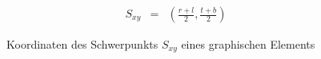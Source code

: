 \begin{figure}[H]
\begin{minipage}[c]{0.47\textwidth}
	\begin{flushright}
		
	\end{flushright}
\end{minipage}
\begin{minipage}[c]{0.47\textwidth}
\begin{flushleft}
		\begin{eqnarray*}
			S_{xy}	&=& \left(\frac{r+l}{2}, \frac{t+b}{2}\right)
		\end{eqnarray*}
\end{flushleft}
\end{minipage}
\caption{Koordinaten des Schwerpunkts $S_{xy}$ eines graphischen Elements}
\label{fig:mittelpunkt}
\end{figure}